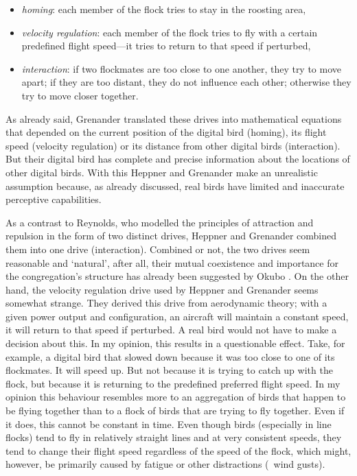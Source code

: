 \begin{itemize}
\item \emph{homing}: each member of the flock tries to stay in the roosting area,
\item \emph{velocity regulation}: each member of the flock tries to fly with a certain predefined flight speed---it tries to return to that speed if perturbed,
\item \emph{interaction}: if two flockmates are too close to one another, they try to move apart; if they are too distant, they do not influence each other; otherwise they try to move closer together. 
\end{itemize}

As already said, Grenander translated these drives into mathematical equations that depended on the current position of the digital bird (homing), its flight speed (velocity regulation) or its distance from other digital birds (interaction). But their digital bird has complete and precise information about the locations of other digital birds. With this Heppner and Grenander make an unrealistic assumption because, as already discussed, real birds have limited and inaccurate perceptive capabilities.

As a contrast to Reynolds, who modelled the principles of attraction and repulsion in the form of two distinct drives, Heppner and Grenander combined them into one drive (interaction). Combined or not, the two drives seem reasonable and `natural', after all, their mutual coexistence and importance for the congregation's structure has already been suggested by Okubo \cite{okubo:1980}. On the other hand, the velocity regulation drive used by Heppner and Grenander seems somewhat strange. They derived this drive from aerodynamic theory; with a given power output and configuration, an aircraft will maintain a constant speed, it will return to that speed if perturbed. A real bird would not have to make a decision about this. In my opinion, this results in a questionable effect. Take, for example, a digital bird that slowed down because it was too close to one of its flockmates. It will speed up. But not because it is trying to catch up with the flock, but because it is returning to the predefined preferred flight speed. In my opinion this behaviour resembles more to an aggregation of birds that happen to be flying together than to a flock of birds that are trying to fly together.  Even if it does, this cannot be constant in time. Even though birds (especially in line flocks) tend to fly in relatively straight lines and at very consistent speeds, they tend to change their flight speed regardless of the speed of the flock, which might, however, be primarily caused by fatigue or other distractions (\eg\ wind gusts). 

